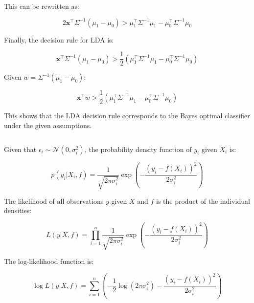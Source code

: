 \documentclass[oneside,solution]{seu-ml-assign}
\begin{document}
This can be rewritten as:

\begin{equation}
  2\mathbf{x}^\top \Sigma^{-1} (\mu_1 - \mu_0) > \mu_1^\top \Sigma^{-1} \mu_1 - \mu_0^\top \Sigma^{-1} \mu_0
\end{equation}

Finally, the decision rule for LDA is:

\begin{equation}
  \mathbf{x}^\top \Sigma^{-1} (\mu_1 - \mu_0) > \frac{1}{2} (\mu_1^\top \Sigma^{-1} \mu_1 - \mu_0^\top \Sigma^{-1} \mu_0)
\end{equation}

Given \( w = \Sigma^{-1} (\mu_1 - \mu_0) \):

\begin{equation}
  \mathbf{x}^\top w > \frac{1}{2} (\mu_1^\top \Sigma^{-1} \mu_1 - \mu_0^\top \Sigma^{-1} \mu_0)
\end{equation}

This shows that the LDA decision rule corresponds to the Bayes optimal classifier under the given assumptions.


\subsection{}
Given that \(\epsilon_i \sim \mathcal{N}(0, \sigma_i^2)\), the probability density function of \(y_i\) given \(X_i\) is:

\begin{equation}
  p(y_i | X_i, f) = \frac{1}{\sqrt{2\pi\sigma_i^2}} \exp\left(-\frac{(y_i - f(X_i))^2}{2\sigma_i^2}\right)
\end{equation}

The likelihood of all observations \(y\) given \(X\) and \(f\) is the product of the individual densities:

\begin{equation}
  L(y | X, f) = \prod_{i=1}^n \frac{1}{\sqrt{2\pi\sigma_i^2}} \exp\left(-\frac{(y_i - f(X_i))^2}{2\sigma_i^2}\right)
\end{equation}

The log-likelihood function is:

\begin{equation}
  \log L(y | X, f) = \sum_{i=1}^n \left( -\frac{1}{2} \log(2\pi\sigma_i^2) - \frac{(y_i - f(X_i))^2}{2\sigma_i^2} \right)
\end{equation}
\end{document}
